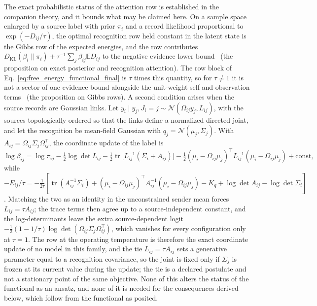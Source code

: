 \documentclass[11pt]{article}
\begin{document}
The exact probabilistic status of the attention row is established in the companion theory, and it bounds what may be claimed here. On a sample space enlarged by a source label with prior $\pi_i$ and a record likelihood proportional to $\exp(-D_{ij}/\tau)$, the optimal recognition row held constant in the latent state is the Gibbs row of the expected energies, and the row contributes $D_{\mathrm{KL}}(\beta_i \| \pi_i) + \tau^{-1}\sum_j \beta_{ij} \mathbb{E} D_{ij}$ to the negative evidence lower bound~\cite[Ch.~6]{DennisGaugeVFE2026} (the proposition on exact posterior and recognition attention). The row block of Eq.~\eqref{eq:free_energy_functional_final} is $\tau$ times this quantity, so for $\tau \neq 1$ it is not a sector of one evidence bound alongside the unit-weight self and observation terms~\cite[Ch.~12]{DennisGaugeVFE2026} (the proposition on Gibbs rows). A second condition arises when the source records are Gaussian links. Let $y_i \mid y_j, J_i = j \sim \mathcal{N}(\Omega_{ij} y_j, L_{ij})$, with the sources topologically ordered so that the links define a normalized directed joint, and let the recognition be mean-field Gaussian with $q_j = \mathcal{N}(\mu_j, \Sigma_j)$. With $A_{ij} = \Omega_{ij}\Sigma_j\Omega_{ij}^\top$, the coordinate update of the label is
\begin{equation}
\log \beta_{ij} = \log \pi_{ij} - \tfrac{1}{2}\log\det L_{ij} - \tfrac{1}{2}\operatorname{tr}\big[L_{ij}^{-1}(\Sigma_i + A_{ij})\big] - \tfrac{1}{2}(\mu_i - \Omega_{ij}\mu_j)^\top L_{ij}^{-1}(\mu_i - \Omega_{ij}\mu_j) + \text{const},
\end{equation}
while $-E_{ij}/\tau = -\frac{1}{2\tau}[\operatorname{tr}(A_{ij}^{-1}\Sigma_i) + (\mu_i - \Omega_{ij}\mu_j)^\top A_{ij}^{-1}(\mu_i - \Omega_{ij}\mu_j) - K_q + \log\det A_{ij} - \log\det\Sigma_i]$. Matching the two as an identity in the unconstrained sender mean forces $L_{ij} = \tau A_{ij}$; the trace terms then agree up to a source-independent constant, and the log-determinants leave the extra source-dependent logit $-\tfrac{1}{2}(1 - 1/\tau)\log\det(\Omega_{ij}\Sigma_j\Omega_{ij}^\top)$, which vanishes for every configuration only at $\tau = 1$. The row at the operating temperature is therefore the exact coordinate update of no model in this family, and the tie $L_{ij} = \tau A_{ij}$ sets a generative parameter equal to a recognition covariance, so the joint is fixed only if $\Sigma_j$ is frozen at its current value during the update; the tie is a declared postulate and not a stationary point of the same objective. None of this alters the status of the functional as an ansatz, and none of it is needed for the consequences derived below, which follow from the functional as posited.
\end{document}
